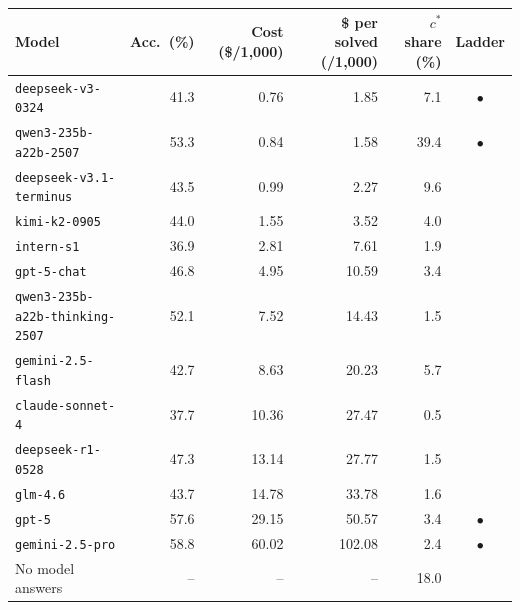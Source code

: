 \setlength{\tabcolsep}{4pt}
\begin{tabular}{@{}lrrrrc@{}}
\toprule
Model & Acc.\ (\%) & Cost (\$/1{,}000) & \$ per solved (/1{,}000) & $c^*$ share (\%) & Ladder \\
\midrule
\texttt{deepseek-v3-0324} & 41.3 & 0.76 & 1.85 & 7.1 & $\bullet$ \\
\texttt{qwen3-235b-a22b-2507} & 53.3 & 0.84 & 1.58 & 39.4 & $\bullet$ \\
\texttt{deepseek-v3.1-terminus} & 43.5 & 0.99 & 2.27 & 9.6 &  \\
\texttt{kimi-k2-0905} & 44.0 & 1.55 & 3.52 & 4.0 &  \\
\texttt{intern-s1} & 36.9 & 2.81 & 7.61 & 1.9 &  \\
\texttt{gpt-5-chat} & 46.8 & 4.95 & 10.59 & 3.4 &  \\
\texttt{qwen3-235b-a22b-thinking-2507} & 52.1 & 7.52 & 14.43 & 1.5 &  \\
\texttt{gemini-2.5-flash} & 42.7 & 8.63 & 20.23 & 5.7 &  \\
\texttt{claude-sonnet-4} & 37.7 & 10.36 & 27.47 & 0.5 &  \\
\texttt{deepseek-r1-0528} & 47.3 & 13.14 & 27.77 & 1.5 &  \\
\texttt{glm-4.6} & 43.7 & 14.78 & 33.78 & 1.6 &  \\
\texttt{gpt-5} & 57.6 & 29.15 & 50.57 & 3.4 & $\bullet$ \\
\texttt{gemini-2.5-pro} & 58.8 & 60.02 & 102.08 & 2.4 & $\bullet$ \\
\midrule
No model answers & -- & -- & -- & 18.0 &  \\
\bottomrule
\end{tabular}
